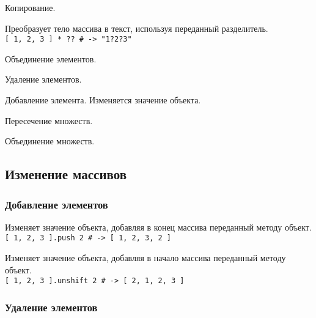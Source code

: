 \begin{methodlist}
  Копирование. 

  Преобразует тело массива в текст, используя переданный разделитель. 
  \\\verb![ 1, 2, 3 ] * ?? # -> "1?2?3"!

  Объединение элементов. 

  Удаление элементов. 

  Добавление элемента.  Изменяется значение объекта.

  Пересечение множеств.

  Объединение множеств. 
\end{methodlist}

\subsection*{Изменение массивов}

\subsubsection*{Добавление элементов}

\begin{methodlist}
  Изменяет значение объекта, добавляя в конец массива переданный методу объект.
  \\\verb![ 1, 2, 3 ].push 2 # -> [ 1, 2, 3, 2 ]!

  Изменяет значение объекта, добавляя в начало массива переданный методу объект. 
  \\\verb![ 1, 2, 3 ].unshift 2 # -> [ 2, 1, 2, 3 ]!
\end{methodlist}

\subsubsection*{Удаление элементов} 

